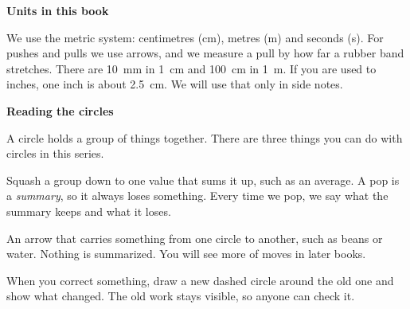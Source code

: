 {\sans\bfseries\large\color{sky!70!black} Units in this book}\par
We use the metric system: centimetres (cm), metres (m) and seconds (s). For pushes and pulls we use arrows, and we measure a pull by how far a rubber band stretches.
There are 10~mm in 1~cm and 100~cm in 1~m. If you are used to inches, one inch is about 2.5~cm. We will use that only in side notes.
\clearpage

\thispagestyle{plain}\label{circlecard}
{\sans\bfseries\LARGE\color{ink} Reading the circles}\par\vspace{0.1cm}
A circle holds a group of things together. There are three things you can do with circles in this series.

\begin{center}
\end{center}

\begin{description}[leftmargin=0pt,itemsep=0.4em,style=unboxed]
\item[\textcolor{tomato}{\sans\bfseries Pop}] Squash a group down to one value that sums it up, such as an average. A pop is a \emph{summary}, so it always loses something. Every time we pop, we say what the summary keeps and what it loses.
\item[\textcolor{sky!70!black}{\sans\bfseries Move}] An arrow that carries something from one circle to another, such as beans or water. Nothing is summarized. You will see more of moves in later books.
\item[\textcolor{tangerine!80!black}{\sans\bfseries Wrap}] When you correct something, draw a new dashed circle around the old one and show what changed. The old work stays visible, so anyone can check it.
\end{description}

